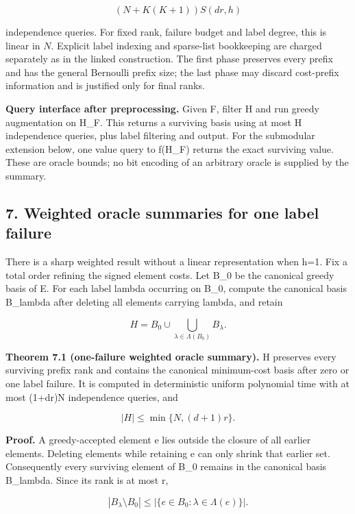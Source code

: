 \[
(N+K(K+1))S(dr,h)
\]

independence queries. For fixed rank, failure budget and label degree, this is linear in \(N\). Explicit label indexing and sparse-list bookkeeping are charged separately as in the linked construction. The first phase preserves every prefix and has the general Bernoulli prefix size; the last phase may discard cost-prefix information and is justified only for final ranks.

\textbf{Query interface after preprocessing.} Given F, filter H and run greedy augmentation on H\_F. This returns a surviving basis using at most \textbar H\textbar{} independence queries, plus label filtering and output. For the submodular extension below, one value query to f(H\_F) returns the exact surviving value. These are oracle bounds; no bit encoding of an arbitrary oracle is supplied by the summary.

\hypertarget{af-4c0863a692-weighted-oracle-summaries-for-one-label-failure}{%
\subsection{7. Weighted oracle summaries for one label failure}\label{af-4c0863a692-weighted-oracle-summaries-for-one-label-failure}}

There is a sharp weighted result without a linear representation when h=1. Fix a total order refining the signed element costs. Let B\_0 be the canonical greedy basis of E. For each label lambda occurring on B\_0, compute the canonical basis B\_lambda after deleting all elements carrying lambda, and retain

\[
H=B_0\cup\bigcup_{\lambda\in\Lambda(B_0)}B_\lambda.
\]

\textbf{Theorem 7.1 (one-failure weighted oracle summary).} H preserves every surviving prefix rank and contains the canonical minimum-cost basis after zero or one label failure. It is computed in deterministic uniform polynomial time with at most (1+dr)N independence queries, and

\[
|H|\le\min\{N,(d+1)r\}. \tag{8}
\]

\textbf{Proof.} A greedy-accepted element e lies outside the closure of all earlier elements. Deleting elements while retaining e can only shrink that earlier set. Consequently every surviving element of B\_0 remains in the canonical basis B\_lambda. Since its rank is at most r,

\[
|B_\lambda\setminus B_0|
 \le |\{e\in B_0:\lambda\in\Lambda(e)\}|.
\]

